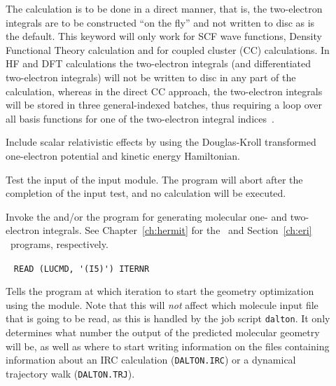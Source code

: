 \begin{description}

\item[] The calculation is to be done in a direct
manner, that
is, the two-electron integrals are to be
constructed ``on the fly''
and not written to disc as is the default. This keyword will only work
for SCF wave functions,
Density Functional Theory
calculation and for
coupled cluster (CC) calculations. In
HF and DFT calculations the
two-electron integrals (and differentiated
two-electron integrals) will not be written to disc in any part of the
calculation, whereas in the direct CC approach, the two-electron
integrals will be stored in three general-indexed batches, thus
requiring a loop over all basis functions for one of the two-electron
integral indices~\cite{directCC}.

\item[] Include scalar relativistic effects by using the
Douglas-Kroll transformed one-electron potential and kinetic energy Hamiltonian.


\item[] Test the input of the  input
module. The program will abort after the completion of the input test,
and no calculation will be executed.

\item[] Invoke the {\her} and/or the {\eri} program for generating molecular one-
and two-electron integrals. See
Chapter~\ref{ch:hermit} for the \her\ and Section~\ref{ch:eri} \eri\ programs, respectively.

\item[]\verb| |\newline
\verb|READ (LUCMD, '(I5)') ITERNR|

Tells the program at which iteration to start the geometry optimization
using the  module.
Note that this will {\em not} affect which molecule
input file that is going to be read, as this is handled by the
job script {\tt dalton}. It only determines what number the
output of the predicted molecular geometry will be, as well as where to start 
writing information on the files containing information about an IRC 
calculation (\verb|DALTON.IRC|) or a dynamical trajectory walk (\verb|DALTON.TRJ|).


\end{description}
